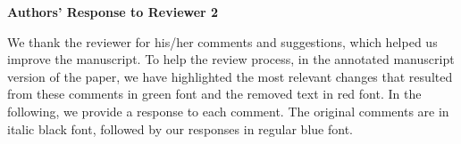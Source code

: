 \documentclass{article}
\begin{document}
\newpage

\begin{center}
	\bf
	\large
	Authors' Response to Reviewer 2
\end{center}

\noindent
We thank the reviewer for his/her comments and suggestions, which helped us improve the manuscript. To help the review process, in the annotated manuscript version of the paper, we have highlighted the most relevant changes that resulted from these comments in green font and the removed text in red font. In the following, we provide a response to each comment. The original comments are in italic black font, followed by our responses in regular blue font.
\vspace{2ex}
\newline


%
\end{document}
